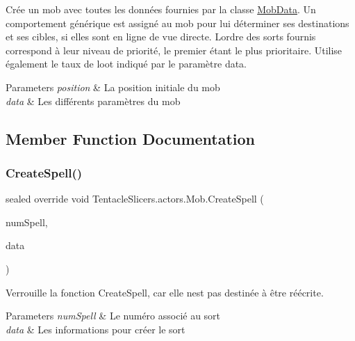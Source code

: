 Crée un mob avec toutes les données fournies par la classe \hyperlink{class_tentacle_slicers_1_1actors_1_1_mob_data}{Mob\+Data}. Un comportement générique est assigné au mob pour lui déterminer ses destinations et ses cibles, si elles sont en ligne de vue directe. L\textquotesingle{}ordre des sorts fournis correspond à leur niveau de priorité, le premier étant le plus prioritaire. Utilise également le taux de loot indiqué par le paramètre data. 


\begin{DoxyParams}{Parameters}
{\em position} & La position initiale du mob \\
\hline
{\em data} & Les différents paramètres du mob \\
\hline
\end{DoxyParams}


\subsection{Member Function Documentation}
\mbox{\label{class_tentacle_slicers_1_1actors_1_1_mob_a79c96a3a4ea1b3a874e28a467683dd39}} 
\subsubsection{\texorpdfstring{Create\+Spell()}{CreateSpell()}}
{\footnotesize\ttfamily sealed override void Tentacle\+Slicers.\+actors.\+Mob.\+Create\+Spell (\begin{DoxyParamCaption}\item[{int}]{num\+Spell,  }\item[{\hyperlink{class_tentacle_slicers_1_1spells_1_1_spell_data}{Spell\+Data}}]{data }\end{DoxyParamCaption})\hspace{0.3cm}{\ttfamily [virtual]}}



Verrouille la fonction Create\+Spell, car elle n\textquotesingle{}est pas destinée à être réécrite. 


\begin{DoxyParams}{Parameters}
{\em num\+Spell} & Le numéro associé au sort \\
\hline
{\em data} & Les informations pour créer le sort \\
\hline
\end{DoxyParams}


